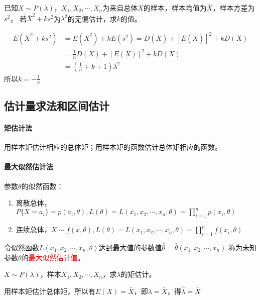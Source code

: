 \begin{example}
    已知$X\sim P(\lambda)$，$X_1,X_2,\cdots,X_n$为来自总体$X$的样本，样本均值为$\bar{X}$，样本方差为$s^2$，
    若$\bar{X}^2+ks^2$为$\lambda^2$的无偏估计，求$k$的值。
\end{example}
\begin{solution}
    \begin{align*}
        E\left(\bar{X}^2 + ks^2\right)
         & = E\left(\bar{X}^2\right) + kE\left(s^2\right)
        = D\left(\bar{X}\right) + \left[E\left(\bar{X}\right)\right]^2 + kD(X) \\
         & = \frac{1}{n}D(X) + \left[E(X)\right]^2 + kD(X)                     \\
         & =(\frac{1}{n}+k+1)\lambda^2
    \end{align*}
    所以$k=-\frac{1}{n}$
\end{solution}

\subsection{估计量求法和区间估计}
\paragraph{矩估计法} 用样本矩估计相应的总体矩；用样本矩的函数估计总体矩相应的函数。

\paragraph{最大似然估计法}
参数$\theta$的似然函数：
\begin{enumerate}[(1)]
    \item 离散总体，$P\{X=a_i\} = p(a_i,\theta), L(\theta) = L(x_1,x_2,\cdots,x_n,\theta) = \prod_{i=1}^n p(x_i,\theta)$
    \item 连续总体，$X\sim f(x,\theta), L(\theta)=L(x_1,x_2,\cdots,x_n,\theta)=\prod_{i=1}^n f(x_i,\theta)$
\end{enumerate}
令似然函数$L(x_1,x_2,\cdots,x_n,\theta)$达到最大值的参数值$\hat{\theta} = \hat{\theta}(x_1,x_2,\cdots,x_n)$
称为未知参数$\theta$的\textcolor{red}{最大似然估计值}。

\begin{example}
    $X\sim P(\lambda)$，样本$X_1,X_2,\cdots,X_n$，求$\lambda$的矩估计。
\end{example}
\begin{solution}
    用样本矩估计总体矩，所以有$E(X)=\bar{X}$，即$\lambda=\bar{X}$，得$\hat{\lambda} = \bar{X}$
\end{solution}

